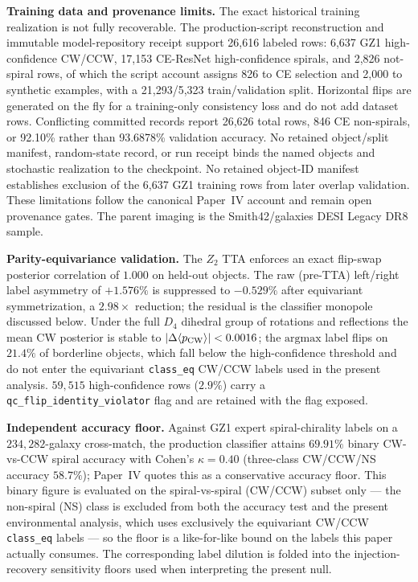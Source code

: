 \documentclass[twocolumn,linenumbers]{aastex702}
\begin{document}
\textbf{Training data and provenance limits.} The exact historical
training realization is not fully recoverable. The production-script
reconstruction and immutable model-repository receipt support 26,616
labeled rows: 6,637 GZ1 high-confidence CW/CCW, 17,153 CE-ResNet
high-confidence spirals, and 2,826 not-spiral rows, of which the script
account assigns 826 to CE selection and 2,000 to synthetic examples,
with a 21,293/5,323 train/validation split. Horizontal flips are generated
on the fly for a training-only consistency loss and do not add dataset
rows. Conflicting committed records report 26,626 total rows, 846 CE
non-spirals, or 92.10\% rather than 93.6878\% validation accuracy. No
retained object/split manifest, random-state record, or run receipt binds
the named objects and stochastic realization to the checkpoint. No
retained object-ID manifest establishes exclusion of the 6,637 GZ1
training rows from later overlap validation. These limitations follow
the canonical Paper~IV account and remain open provenance gates. The
parent imaging is the Smith42/galaxies DESI Legacy DR8 sample.

\textbf{Parity-equivariance validation.} The $Z_2$ TTA enforces an
exact flip-swap posterior correlation of $1.000$ on held-out objects.
The raw (pre-TTA) left/right label asymmetry of $+1.576\%$ is
suppressed to $-0.529\%$ after equivariant symmetrization, a
$2.98\times$ reduction; the residual is the classifier monopole
discussed below. Under the full $D_4$ dihedral group of rotations and
reflections the mean CW posterior is stable to
$|\Delta\langle p_{\rm CW}\rangle|<0.0016$; the $\mathrm{argmax}$ label
flips on $21.4\%$ of borderline objects, which fall below the
high-confidence threshold and do not enter the equivariant
\texttt{class\_eq} CW/CCW labels used in the present analysis.
$59{,}515$ high-confidence rows ($2.9\%$) carry a
\texttt{qc\_flip\_identity\_violator} flag and are retained with the
flag exposed.

\textbf{Independent accuracy floor.} Against GZ1 expert spiral-chirality
labels on a $234{,}282$-galaxy cross-match, the production classifier
attains $69.91\%$ binary CW-vs-CCW spiral accuracy with Cohen's
$\kappa=0.40$ (three-class CW/CCW/NS accuracy $58.7\%$); Paper~IV quotes
this as a conservative accuracy floor. This binary figure is evaluated
on the spiral-vs-spiral (CW/CCW) subset only --- the non-spiral (NS)
class is excluded from both the accuracy test and the present
environmental analysis, which uses exclusively the equivariant CW/CCW
\texttt{class\_eq} labels --- so the floor is a like-for-like bound on
the labels this paper actually consumes. The corresponding label
dilution is folded into the injection-recovery sensitivity floors used
when interpreting the present null.
\end{document}
